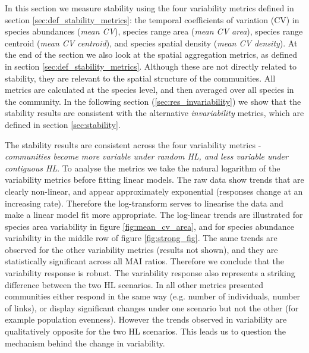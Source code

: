 
In this section we measure stability using the four variability metrics defined in section \ref{sec:def_stability_metrics}: the temporal coefficients of variation (CV) in species abundances (\emph{mean CV}), species range area (\emph{mean CV area}), species range centroid (\emph{mean CV centroid}), and species spatial density (\emph{mean CV density}). At the end of the section we also look at the spatial aggregation metrics, as defined in section \ref{sec:def_stability_metrics}. Although these are not directly related to stability, they are relevant to the spatial structure of the communities. All metrics are calculated at the species level, and then averaged over all species in the community. In the following section (\ref{sec:res_invariability}) we show that the stability results are consistent with the alternative \emph{invariability} metrics, which are defined in section \ref{sec:stability}.

The stability results are consistent across the four variability metrics - \emph{communities become more variable under random HL, and less variable under contiguous HL}. To analyse the metrics we take the natural logarithm of the variability metrics before fitting linear models. The raw data show trends that are clearly non-linear, and appear approximately exponential (responses change at an increasing rate). Therefore the log-transform serves to linearise the data and make a linear model fit more appropriate. The log-linear trends are illustrated for species area variability in figure \ref{fig:mean_cv_area}, and for species abundance variability in the middle row of figure \ref{fig:strong_fig}. The same trends are observed for the other variability metrics (results not shown), and they are statistically significant across all MAI ratios. Therefore we conclude that the variability response is robust. The variability response also represents a striking difference between the two HL scenarios. In all other metrics presented communities either respond in the same way (e.g. number of individuals, number of links), or display significant changes under one scenario but not the other (for example population evenness). However the trends observed in variability are qualitatively opposite for the two HL scenarios. This leads us to question the mechanism behind the change in variability.

